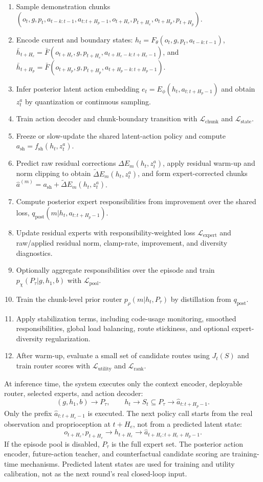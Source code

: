 \documentclass[10pt]{article}
\newenvironment{algorithmic}[1][]%
  {\begin{enumerate}[leftmargin=1.5em,label=\arabic*.,itemsep=0.12em,topsep=0.2em]}%
  {\end{enumerate}}
\newcommand{\State}{\item}
\begin{document}
\begin{algorithm}[H]
\caption{Training Latent-Action Routing}
\begin{algorithmic}[1]
\State Sample demonstration chunks $(o_t,g,p_t,a_{t-k:t-1},a_{t:t+H_p-1},o_{t+H_e},p_{t+H_e},o_{t+H_p},p_{t+H_p})$.
\State Encode current and boundary states: $h_t=F_\theta(o_t,g,p_t,a_{t-k:t-1})$, $\bar{h}_{t+H_e}=\bar{F}(o_{t+H_e},g,p_{t+H_e},a_{t+H_e-k:t+H_e-1})$, and $\bar{h}_{t+H_p}=\bar{F}(o_{t+H_p},g,p_{t+H_p},a_{t+H_p-k:t+H_p-1})$.
\State Infer posterior latent action embedding $e_t=E_\phi(h_t,a_{t:t+H_p-1})$ and obtain $z_t^a$ by quantization or continuous sampling.
\State Train action decoder and chunk-boundary transition with $\mathcal{L}_{\mathrm{chunk}}$ and $\mathcal{L}_{\mathrm{state}}$.
\State Freeze or slow-update the shared latent-action policy and compute $a_{\mathrm{sh}}=f_{\mathrm{sh}}(h_t,z_t^a)$.
\State Predict raw residual corrections $\Delta E_m(h_t,z_t^a)$, apply residual warm-up and norm clipping to obtain $\tilde{\Delta}E_m(h_t,z_t^a)$, and form expert-corrected chunks $\hat{a}^{(m)}=a_{\mathrm{sh}}+\tilde{\Delta}E_m(h_t,z_t^a)$.
\State Compute posterior expert responsibilities from improvement over the shared loss, $q_{\mathrm{post}}(m|h_t,a_{t:t+H_p-1})$.
\State Update residual experts with responsibility-weighted loss $\mathcal{L}_{\mathrm{expert}}$ and raw/applied residual norm, clamp-rate, improvement, and diversity diagnostics.
\State Optionally aggregate responsibilities over the episode and train $p_\chi(P_\tau|g,h_1,b)$ with $\mathcal{L}_{\mathrm{pool}}$.
\State Train the chunk-level prior router $p_\rho(m|h_t,P_\tau)$ by distillation from $q_{\mathrm{post}}$.
\State Apply stabilization terms, including code-usage monitoring, smoothed responsibilities, global load balancing, route stickiness, and optional expert-diversity regularization.
\State After warm-up, evaluate a small set of candidate routes using $J_t(S)$ and train router scores with $\mathcal{L}_{\mathrm{utility}}$ and $\mathcal{L}_{\mathrm{rank}}$.
\end{algorithmic}
\end{algorithm}

At inference time, the system executes only the context encoder, deployable router, selected experts, and action decoder:
\begin{equation}
 (g,h_1,b)\rightarrow P_\tau,\qquad h_t\rightarrow S_t\subseteq P_\tau\rightarrow \hat{a}_{t:t+H_p-1}.
\end{equation}
Only the prefix $\hat{a}_{t:t+H_e-1}$ is executed. The next policy call starts
from the real observation and proprioception at $t+H_e$, not from a predicted
latent state:
\begin{equation}
o_{t+H_e},p_{t+H_e}\rightarrow h_{t+H_e}\rightarrow
\hat{a}_{t+H_e:t+H_e+H_p-1}.
\end{equation}
If the episode pool is disabled, $P_\tau$ is the full expert set. The posterior
action encoder, future-action teacher, and counterfactual candidate scoring are
training-time mechanisms. Predicted latent states are used for training and
utility calibration, not as the next round's real closed-loop input.
\end{document}
